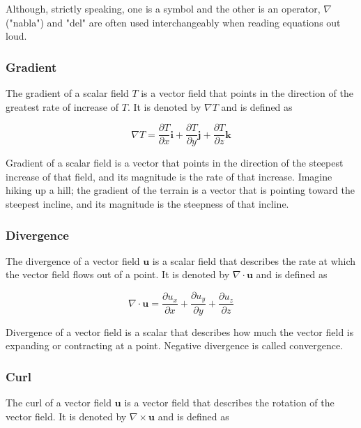 \documentclass[12pt]{article}
\numberwithin{equation}{section}
\numberwithin{figure}{section}
\numberwithin{table}{section}
\begin{document}
Although, strictly speaking, one is a symbol and the other is an operator,
$\nabla$ ("nabla") and "del" are often used interchangeably when reading equations
out loud.

\subsubsection{Gradient}

The gradient of a scalar field $T$ is a vector field that points in the
direction of the greatest rate of increase of $T$.
It is denoted by $\nabla T$ and is defined as

\begin{equation}
  \nabla T = \frac{\partial T}{\partial x} \mathbf{i} +
    \frac{\partial T}{\partial y} \mathbf{j} +
    \frac{\partial T}{\partial z} \mathbf{k}
\end{equation}

Gradient of a scalar field is a vector that points in the direction of the
steepest increase of that field, and its magnitude is the rate of that increase.
Imagine hiking up a hill; the gradient of the terrain is a vector
that is pointing toward the steepest incline, and its magnitude is the steepness
of that incline.

\subsubsection{Divergence}

The divergence of a vector field $\mathbf{u}$ is a scalar field that describes
the rate at which the vector field flows out of a point.
It is denoted by $\nabla \cdot \mathbf{u}$ and is defined as

\begin{equation}
  \label{eq:divergence}
  \nabla \cdot \mathbf{u} = \frac{\partial u_x}{\partial x} +
    \frac{\partial u_y}{\partial y} + \frac{\partial u_z}{\partial z}
\end{equation}

Divergence of a vector field is a scalar that describes how much the vector
field is expanding or contracting at a point.
Negative divergence is called convergence.

\subsubsection{Curl}

The curl of a vector field $\mathbf{u}$ is a vector field that describes the
rotation of the vector field.
It is denoted by $\nabla \times \mathbf{u}$ and is defined as
\end{document}
